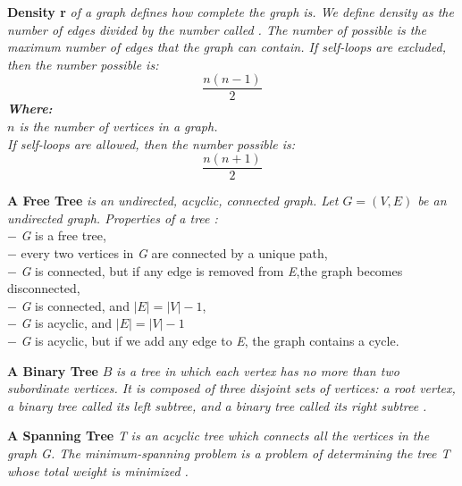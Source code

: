 	\newpage
	\begin{definition} \textbf{Density r} \emph{of a graph defines how complete the graph is. We define density as the number of edges divided by the number called . The number of possible is the maximum number of edges that the graph can contain.
	If self-loops are excluded, then the number possible is:\\
	\begin{equation}\label{acyclic_density}
	\frac{n(n-1)}{2}
	\end{equation}
	\textbf{Where:}\\
	$n$ is the number of vertices in a graph.\\
	\newline
	If self-loops are allowed, then the number possible is:
	\begin{equation}\label{cyclic_density}
	\frac{n(n+1)}{2}
	\end{equation}
	}
	\newline
	\end{definition}
\begin{definition}\textbf{A Free Tree} \emph{ is an undirected, acyclic, connected graph. Let $G = (V,E)$ be an undirected graph. Properties of a tree \cite{6}:}\\
	$-$ \textit{G} is a free tree,\\
	$-$ every two vertices in \textit{G} are connected by a unique path,\\
	$-$ \textit{G} is connected, but if any edge is removed from \textit{E},the graph becomes disconnected,\\
	$-$ \textit{G} is connected, and $|E| = |V| - 1$,\\
	$-$ \textit{G} is acyclic, and $|E| = |V| - 1$\\
	$-$ \textit{G} is acyclic, but if we add any edge to \textit{E}, the graph contains a cycle.\\
\end{definition}
\begin{definition}\textbf{A Binary Tree} $B$ \emph{is a tree in which each vertex has no more than two subordinate vertices. It is composed of three disjoint sets of vertices: a root vertex, a binary tree called its left subtree, and a binary tree called its right subtree \cite{7}.}\end{definition}
\begin{definition}\textbf{A Spanning Tree }\textit{T} \emph{is an acyclic tree which connects all the vertices in the graph \textit{G}. The minimum-spanning problem is a problem of determining the tree \textit{T} whose total weight is minimized \cite{8}.}\end{definition}

